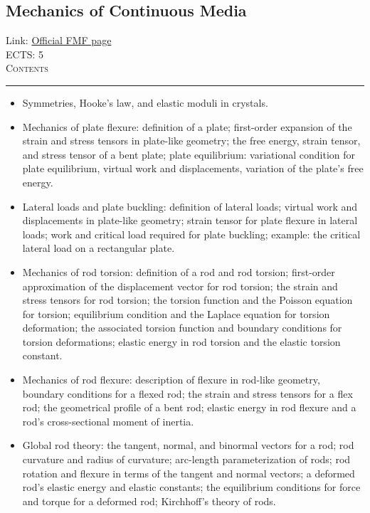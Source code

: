 \documentclass[11pt, a4paper]{article}
\newenvironment{course}[3]{
\subsection{#1}%
Link: \href{#2}{Official FMF page}\\%
ECTS: #3%
\vspace{1ex}
\\
{\large \textsc{Contents}}\\[-0.9ex]%
\rule{\textwidth}{0.5pt}
\vspace{-3ex}
}
{}
\newenvironment{chapter}[1]{
\begin{tcolorbox}[title=#1, breakable]
}
{\end{tcolorbox}}
\begin{document}
\begin{course}{Mechanics of Continuous Media}{https://www.fmf.uni-lj.si/en/study-physics/programmes/1fiz/2020/7000777/courses/1160/}{5}
\begin{chapter}{Fundamentals of the theory of elasticity}
\begin{itemize}
            \item Symmetries, Hooke's law, and elastic moduli in crystals.

            \end{itemize}
    \end{chapter}

    \begin{chapter}{Applications of the theory of elasticity}
        \begin{itemize}

            \item Mechanics of plate flexure: definition of a plate; first-order expansion of the strain and stress tensors in plate-like geometry; the free energy, strain tensor, and stress tensor of a bent plate; plate equilibrium: variational condition for plate equilibrium, virtual work and displacements, variation of the plate's free energy.

            \item Lateral loads and plate buckling: definition of lateral loads; virtual work and displacements in plate-like geometry; strain tensor for plate flexure in lateral loads; work and critical load required for plate buckling; example: the critical lateral load on a rectangular plate.

            \item Mechanics of rod torsion: definition of a rod and rod torsion; first-order approximation of the displacement vector for rod torsion; the strain and stress tensors for rod torsion; the torsion function and the Poisson equation for torsion; equilibrium condition and the Laplace equation for torsion deformation; the associated torsion function and boundary conditions for torsion deformations; elastic energy in rod torsion and the elastic torsion constant.

            \item Mechanics of rod flexure: description of flexure in rod-like geometry, boundary conditions for a flexed rod; the strain and stress tensors for a flex rod; the geometrical profile of a bent rod; elastic energy in rod flexure and a rod's cross-sectional moment of inertia.

            \item Global rod theory: the tangent, normal, and binormal vectors for a rod; rod curvature and radius of curvature; arc-length parameterization of rods; rod rotation and flexure in terms of the tangent and normal vectors; a deformed rod's elastic energy and elastic constants; the equilibrium conditions for force and torque for a deformed rod; Kirchhoff's theory of rods.



\end{itemize}
\end{chapter}
\end{course}
\end{document}
